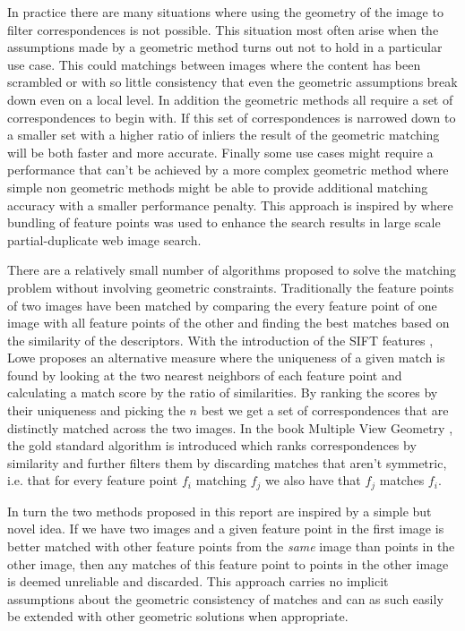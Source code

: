\documentclass{article}
\begin{document}
In practice there are many situations where using the geometry of the 
image to filter correspondences is not possible. This situation most 
often arise when the assumptions made by a geometric method turns out 
not to hold in a particular use case. This could matchings between 
images where the content has been scrambled or with so little 
consistency that even the geometric assumptions break down even on a 
local level. In addition the geometric methods all require a set of 
correspondences to begin with. If this set of correspondences is 
narrowed down to a smaller set with a higher ratio of inliers the result 
of the geometric matching will be both faster and more accurate. Finally 
some use cases might require a performance that can't be achieved by a 
more complex geometric method where simple non geometric methods might 
be able to provide additional matching accuracy with a smaller 
performance penalty. This approach is inspired by \cite{wu2009bundling} 
where bundling of feature points was used to enhance the search results 
in large scale partial-duplicate web image search.

There are a relatively small number of algorithms proposed to solve the 
matching problem without involving geometric constraints. Traditionally 
the feature points of two images have been matched by comparing the 
every feature point of one image with all feature points of the other 
and finding the best matches based on the similarity of the descriptors.  
With the introduction of the SIFT features \cite{lowe2004sift}, Lowe 
proposes an alternative measure where the uniqueness of a given match is 
found by looking at the two nearest neighbors of each feature point and 
calculating a match score by the ratio of similarities. By ranking the 
scores by their uniqueness and picking the $n$ best we get a set of 
correspondences that are distinctly matched across the two images. In 
the book Multiple View Geometry \cite[p.  114]{multipleView}, the gold 
standard algorithm is introduced which ranks correspondences by 
similarity and further filters them by discarding matches that aren't 
symmetric, i.e. that for every feature point $f_i$ matching $f_j$ we 
also have that $f_j$ matches $f_i$.

In turn the two methods proposed in this report are inspired by a simple 
but novel idea. If we have two images and a given feature point in the 
first image is better matched with other feature points from the 
\emph{same} image than points in the other image, then any matches of 
this feature point to points in the other image is deemed unreliable and 
discarded.  This approach carries no implicit assumptions about the 
geometric consistency of matches and can as such easily be extended with 
other geometric solutions when appropriate.
\end{document}
